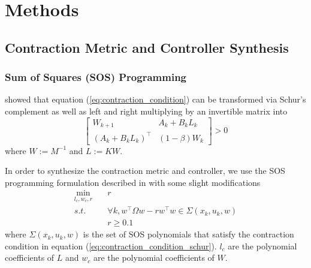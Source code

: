 \documentclass[journal]{IEEEtran}
\begin{document}
\section{Methods}
\subsection{Contraction Metric and Controller Synthesis}
\subsubsection{Sum of Squares (SOS) Programming}

\autocite{weiControlContractionMetric2021} showed that equation (\ref{eq:contraction_condition}) can be transformed via Schur's complement as well as left and right multiplying by an invertible matrix into
\begin{equation}
	\begin{bmatrix}
		W_{k+1} & A_k + B_k L_k \\
		(A_k + B_k L_k)^\top & (1 - \beta) W_k
	\end{bmatrix} > 0
	\label{eq:contraction_condition_schur}
\end{equation}
where $W := M^{-1}$ and $L := KW$.

In order to synthesize the contraction metric and controller, we use the SOS programming formulation described in \autocite{weiControlContractionMetric2021} with some slight modifications
\begin{equation}
	\label{eq:dccm_opt}
	\begin{aligned}
	\min_{l_c, w_c, r} \quad& r \\
	s.t. \quad& \forall k, w^\top \Omega w - r w^\top w \in \Sigma(x_k, u_k, w) \\
	& r \geq 0.1
	\end{aligned}
\end{equation}
where $\Sigma(x_k, u_k, w)$ is the set of SOS polynomials that satisfy the contraction condition in equation (\ref{eq:contraction_condition_schur}). $l_c$ are the polynomial coefficients of $L$ and $w_c$ are the polynomial coefficients of $W$.
\end{document}
